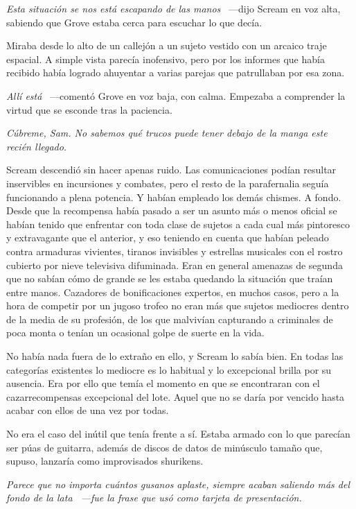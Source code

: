 \emph{Esta situación se nos está escapando de las manos} ~---dijo Scream en voz alta, sabiendo que Grove estaba cerca para escuchar lo que decía.

Miraba desde lo alto de un callejón a un sujeto vestido con un arcaico traje espacial. A simple vista parecía inofensivo, pero por los informes que había recibido había logrado ahuyentar a varias parejas que patrullaban por esa zona.

\emph{Allí está} ~---comentó Grove en voz baja, con calma. Empezaba a comprender la virtud que se esconde tras la paciencia.

\emph{Cúbreme, Sam. No sabemos qué trucos puede tener debajo de la manga este recién llegado.}

Scream descendió sin hacer apenas ruido. Las comunicaciones podían resultar inservibles en incursiones y combates, pero el resto de la parafernalia seguía funcionando a plena potencia. Y habían empleado los demás chismes. A fondo. Desde que la recompensa había pasado a ser un asunto más o menos oficial se habían tenido que enfrentar con toda clase de sujetos a cada cual más pintoresco y extravagante que el anterior, y eso teniendo en cuenta que habían peleado contra armaduras vivientes, tiranos invisibles y estrellas musicales con el rostro cubierto por nieve televisiva difuminada. Eran en general amenazas de segunda que no sabían cómo de grande se les estaba quedando la situación que traían entre manos. Cazadores de bonificaciones expertos, en muchos casos, pero a la hora de competir por un jugoso trofeo no eran más que sujetos mediocres dentro de la media de su profesión, de los que malvivían capturando a criminales de poca monta o tenían un ocasional golpe de suerte en la vida.

No había nada fuera de lo extraño en ello, y Scream lo sabía bien. En todas las categorías existentes lo mediocre es lo habitual y lo excepcional brilla por su ausencia. Era por ello que temía el momento en que se encontraran con el cazarrecompensas excepcional del lote. Aquel que no se daría por vencido hasta acabar con ellos de una vez por todas.

No era el caso del inútil que tenía frente a sí. Estaba armado con lo que parecían ser púas de guitarra, además de discos de datos de minúsculo tamaño que, supuso, lanzaría como improvisados shurikens.

\emph{Parece que no importa cuántos gusanos aplaste, siempre acaban saliendo más del fondo de la lata ~---fue la frase que usó como tarjeta de presentación.}

